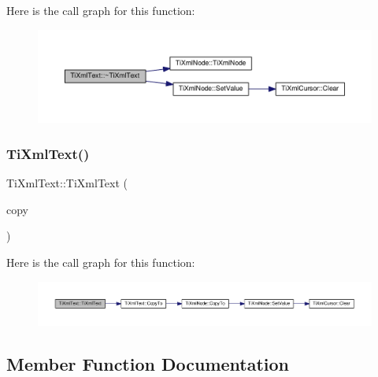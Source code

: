 Here is the call graph for this function\+:
\nopagebreak
\begin{figure}[H]
\begin{center}
\leavevmode
\includegraphics[width=350pt]{class_ti_xml_text_a829a4bd2d8d2461c333eb4f3f5b1b3d2_cgraph}
\end{center}
\end{figure}
\mbox{\label{class_ti_xml_text_a8d2cc1b4af2208cbb0171cf20f6815d1}} 
\subsubsection{\texorpdfstring{Ti\+Xml\+Text()}{TiXmlText()}\hspace{0.1cm}{\footnotesize\ttfamily [2/2]}}
{\footnotesize\ttfamily Ti\+Xml\+Text\+::\+Ti\+Xml\+Text (\begin{DoxyParamCaption}\item[{const \hyperlink{class_ti_xml_text}{Ti\+Xml\+Text} \&}]{copy }\end{DoxyParamCaption})\hspace{0.3cm}{\ttfamily [inline]}}

Here is the call graph for this function\+:
\nopagebreak
\begin{figure}[H]
\begin{center}
\leavevmode
\includegraphics[width=350pt]{class_ti_xml_text_a8d2cc1b4af2208cbb0171cf20f6815d1_cgraph}
\end{center}
\end{figure}


\subsection{Member Function Documentation}
\mbox{\label{class_ti_xml_text_af65964326eac4640bfb97d4622fa0de2}} 
